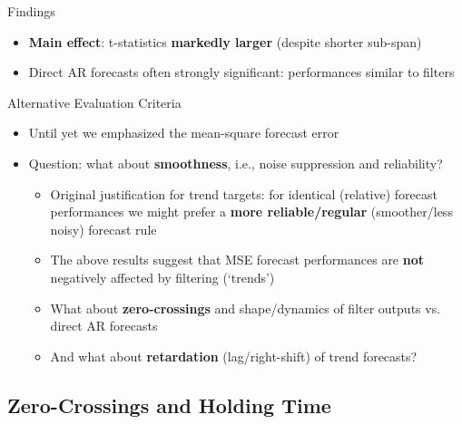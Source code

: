 \documentclass{beamer}
\begin{document}
\begin{frame} {Findings}
\begin{itemize}
\item \textbf{Main effect}: t-statistics \textbf{markedly larger} (despite shorter sub-span)
\item Direct AR forecasts often strongly significant: performances similar to filters

\end{itemize}
\end{frame}



\begin{frame} {Alternative Evaluation Criteria}
\begin{itemize}
\item Until yet we emphasized the mean-square forecast error
\item Question: what about \textbf{smoothness}, i.e., noise suppression and reliability? 
\begin{itemize}
\item Original justification for trend targets: for identical (relative) forecast performances we might prefer a \textbf{more reliable/regular} (smoother/less noisy) forecast rule
\item The above results suggest that MSE forecast performances are \textbf{not} negatively affected by filtering (`trends')
\item What about \textbf{zero-crossings} and shape/dynamics of filter outputs vs. direct AR forecasts
\item And what about \textbf{retardation} (lag/right-shift) of trend forecasts?
\end{itemize}
\end{itemize}
\end{frame}



\subsection{Zero-Crossings and Holding Time}
\end{document}
